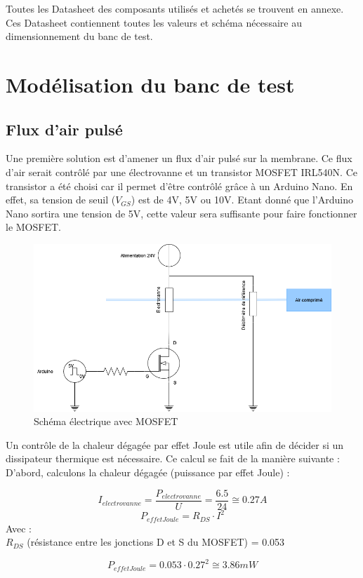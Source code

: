 Toutes les Datasheet des composants utilisés et achetés se trouvent en annexe. Ces Datasheet contiennent toutes les valeurs et schéma nécessaire
au dimensionnement du banc de test.

\section{Modélisation du banc de test}
\subsection{Flux d'air pulsé}
Une première solution est d'amener un flux d'air pulsé sur la membrane. Ce flux d'air serait contrôlé par une électrovanne et un
transistor MOSFET IRL540N. Ce transistor a été choisi car il permet d'être contrôlé grâce à un Arduino Nano. En effet, sa tension de seuil
($V_{GS}$) est de 4V, 5V ou 10V. Etant donné que l'Arduino Nano sortira une tension de 5V, cette valeur sera suffisante pour faire fonctionner
le MOSFET.
\begin{figure}[H]
    \centering
    \includegraphics[scale=0.6]{assets/figures/MOSFET.png}
    \caption{Schéma électrique avec MOSFET}
    \label{fig:MOSFET}
\end{figure}
Un contrôle de la chaleur dégagée par effet Joule est utile afin de décider si un dissipateur thermique est nécessaire. Ce calcul se fait
de la manière suivante :\\
D'abord, calculons la chaleur dégagée (puissance par effet Joule) :

\[I_{electrovanne} = \frac{P_{electrovanne}}{U} = \frac{6.5}{24} \cong 0.27 A \]
\[P_{effetJoule} = R_{DS}\cdot I^2\]
Avec :\\
$R_{DS}$ (résistance entre les jonctions D et S du MOSFET) = 0.053

\begin{equation}
    P_{effetJoule} = 0.053\cdot 0.27^2 \cong 3.86mW
\end{equation}

